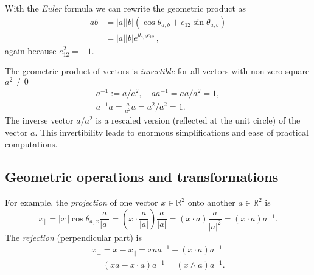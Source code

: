 \documentclass[cameraready]{jcmsi}%
\newcommand{\R}{\mathbb{R}}
\newcommand{\be}{\begin{equation}}
\newcommand{\ee}{\end{equation}}
\begin{document}
With the \textit{Euler} formula we can rewrite the geometric product as
\begin{align} 
  ab &= |a| |b| (\cos \theta_{a,b} + e_{12}\sin \theta_{a,b}) 
  \nonumber \\
  &= |a| |b| e^{\theta_{a,b} e_{12}} \,,
  \label{eq:Euler}
\end{align} 
again because $e_{12}^2=-1$. 

The geometric product of vectors is \textit{invertible} for all vectors with non-zero square 
$a^2 \neq 0$
\begin{gather}
  a^{-1} := a/a^2, \quad 
  a a^{-1} = a a/a^2 = 1, \nonumber \\
  a^{-1} a = \frac{a}{a^2}a = a^2/a^2 = 1. 
\end{gather} 
The inverse vector $a/a^2$ is a rescaled version (reflected at the unit circle) of the vector $a$. 
This invertibility leads to enormous simplifications and ease of practical computations. 


\subsection{Geometric operations and transformations}

For example, the \textit{projection} of one vector $x\in\R^2$ onto another $a \in \R^2$ is
\be 
  x_{\parallel} = | x \,| \cos\theta_{a,x}\frac{a}{|a|} 
  = (x \cdot \frac{a}{|a|})\frac{a}{|a|}
  = (x \cdot a)\frac{a}{|a|^2} 
  = (x \cdot a)a^{-1}.
\ee 
The \textit{rejection} (perpendicular part) is
\begin{gather} 
  x_{\perp} = x-x_{\parallel}
  = x aa^{-1} - (x \cdot a)a^{-1} 
  \nonumber \\
  = (xa-x \cdot a)a^{-1}
  = (x\wedge a)a^{-1}.
\end{gather}
\end{document}
